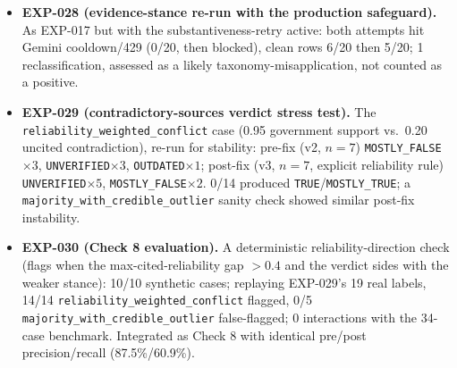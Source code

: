 \documentclass[conference]{IEEEtran}
\begin{document}
\begin{itemize}
\item \textbf{EXP-028 (evidence-stance re-run with the production safeguard).} As EXP-017 but with the substantiveness-retry active: both attempts hit Gemini cooldown/429 (0/20, then blocked), clean rows 6/20 then 5/20; 1 reclassification, assessed as a likely taxonomy-misapplication, not counted as a positive.
\item \textbf{EXP-029 (contradictory-sources verdict stress test).} The \texttt{reliability\_weighted\_conflict} case (0.95 government support vs.\ 0.20 uncited contradiction), re-run for stability: pre-fix (v2, $n{=}7$) \texttt{MOSTLY\_FALSE}$\times3$, \texttt{UNVERIFIED}$\times3$, \texttt{OUTDATED}$\times1$; post-fix (v3, $n{=}7$, explicit reliability rule) \texttt{UNVERIFIED}$\times5$, \texttt{MOSTLY\_FALSE}$\times2$. 0/14 produced \texttt{TRUE}/\texttt{MOSTLY\_TRUE}; a \texttt{majority\_with\_credible\_outlier} sanity check showed similar post-fix instability.
\item \textbf{EXP-030 (Check 8 evaluation).} A deterministic reliability-direction check (flags when the max-cited-reliability gap $>0.4$ and the verdict sides with the weaker stance): 10/10 synthetic cases; replaying EXP-029's 19 real labels, 14/14 \texttt{reliability\_weighted\_conflict} flagged, 0/5 \texttt{majority\_with\_credible\_outlier} false-flagged; 0 interactions with the 34-case benchmark. Integrated as Check 8 with identical pre/post precision/recall (87.5\%/60.9\%).
\end{itemize}



\end{document}
